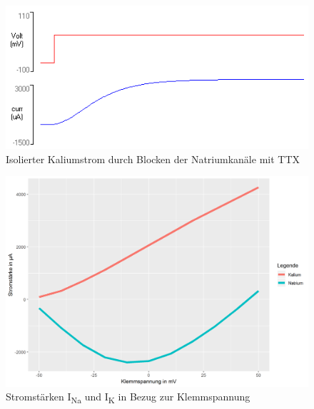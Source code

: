 \documentclass[a4paper]{article}
\begin{document}
\begin{figure}[H]
  \centering
  \includegraphics{images/Aufgabe3_3-TTX_K_Detail.png}
  \caption{Isolierter Kaliumstrom durch Blocken der Natriumkanäle mit TTX}
  \label{fig:A3_3b}
\end{figure}
\begin{figure}[H]
    \centering
    \includegraphics[width=\textwidth]{images/Aufgabe3_4.png}
    \caption{Stromstärken I\textsubscript{Na} und I\textsubscript{K} in Bezug zur Klemmspannung}
    \label{fig:A3_4}
\end{figure}
\end{document}
